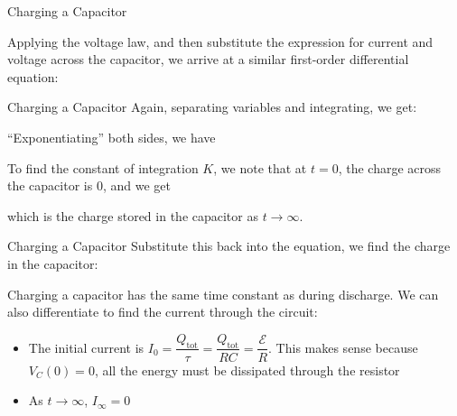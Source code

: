 \documentclass[12pt,aspectratio=169]{beamer}
\begin{document}
\begin{frame}{Charging a Capacitor}
  \begin{center}
  \end{center}
  Applying the voltage law, and then substitute the expression for current and
  voltage across the capacitor, we arrive at a similar first-order differential
  equation:

\end{frame}


\begin{frame}{Charging a Capacitor}
  Again, separating variables and integrating, we get:
  
  
  ``Exponentiating'' both sides, we have
  

  \vspace{-.1in}To find the constant of integration $K$, we note that at $t=0$,
  the charge across the capacitor is $0$, and we get


  \vspace{-.15in}which is the charge stored in the capacitor as
  $t\rightarrow\infty$.
  
\end{frame}




\begin{frame}{Charging a Capacitor}
  Substitute this back into the equation, we find the charge in the capacitor:


  Charging a capacitor has the same time constant as during discharge. We can
  also differentiate to find the current through the circuit:


  \begin{itemize}
  \item The initial current is
    $I_0=\dfrac{Q_\text{tot}}\tau=\dfrac{Q_\text{tot}}{RC}=\dfrac{\mathcal E}R$.
    This makes sense because $V_C(0)=0$, all the energy must be dissipated
    through the resistor
  \item As $t\rightarrow\infty$, $I_\infty=0$
  \end{itemize}
\end{frame}
\end{document}

